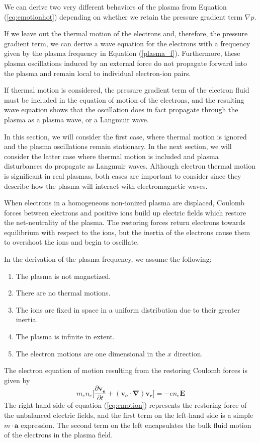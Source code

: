 \documentclass[twocolumn]{article}
\begin{document}
We can derive two very different behaviors of the plasma from Equation (\ref{eq:emotionhot}) depending on whether we retain the pressure gradient term $\nabla p$.

If we leave out the thermal motion of the electrons and, therefore, the pressure gradient term, we can derive a wave equation for the electrons with a frequency given by the plasma frequency in Equation (\ref{plasma_f}).
Furthermore, these plasma oscillations induced by an external force do not propagate forward into the plasma and remain local to individual electron-ion pairs.

If thermal motion is considered, the pressure gradient term of the electron fluid must be included in the equation of motion of the electrons, and the resulting wave equation shows that the oscillation does in fact propagate through the plasma as a plasma wave, or a Langmuir wave.

In this section, we will consider the first case, where thermal motion is ignored and the plasma oscillations remain stationary.
In the next section, we will consider the latter case where thermal motion is included and plasma disturbances do propagate as Langmuir waves.
Although electron thermal motion is significant in real plasmas, both cases are important to consider since they describe how the plasma will interact with electromagnetic waves.

When electrons in a homogeneous non-ionized plasma are displaced, Coulomb forces between electrons and positive ions build up electric fields which restore the net-neutrality of the plasma.
The restoring forces return electrons towards equilibrium with respect to the ions, but the inertia of the electrons cause them to overshoot the ions and begin to oscillate.

In the derivation of the plasma frequency, we assume the following:
\begin{enumerate}
	\item The plasma is not magnetized.
	\item There are no thermal motions.
	\item The ions are fixed in space in a uniform distribution due to their greater inertia.
	\item The plasma is infinite in extent.
	\item The electron motions are one dimensional in the $x$ direction.
\end{enumerate}

The electron equation of motion resulting from the restoring Coulomb forces is given by
\begin{equation} \label{eq:emotion}
	m_en_e \lbrack \frac{\partial \mathbf{v_e}}{\partial t} + \left( \mathbf{v_e} \cdot \mathbf{\nabla} \right) \mathbf{v_e} \rbrack = -en_e\mathbf{E}
\end{equation}
The right-hand side of equation (\ref{eq:emotion}) represents the restoring force of the unbalanced electric fields, and the first term on the left-hand side is a simple $m\cdot\mathbf{a}$ expression.
The second term on the left encapsulates the bulk fluid motion of the electrons in the plasma field.
\end{document}
